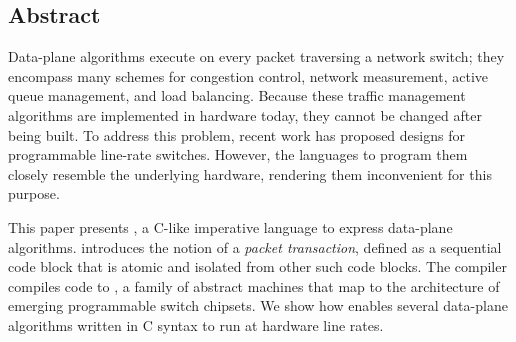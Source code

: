 \subsection*{Abstract}
Data-plane algorithms execute on every packet traversing a network
switch; they encompass many schemes for congestion control, network
measurement, active queue management, and load balancing. Because
these traffic management algorithms are implemented in hardware today,
they cannot be changed after being built. To address this problem,
recent work has proposed designs for programmable line-rate
switches. However, the languages to program them closely resemble the
underlying hardware, rendering them inconvenient for this purpose.

This paper presents \pktlanguage, a C-like imperative language to express
data-plane 
algorithms. \pktlanguage introduces the notion of a {\em packet
transaction}, defined as a sequential code block that is atomic and
isolated from other such code blocks.
The \pktlanguage compiler compiles \pktlanguage code to \absmachine, a
family of abstract machines that map to the architecture of emerging
programmable switch chipsets. We show how \pktlanguage enables several
data-plane algorithms written in C syntax to run at hardware line
rates.

